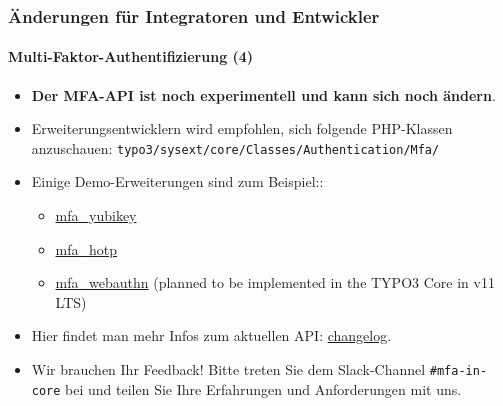 %

\begin{frame}[fragile]
	\frametitle{Änderungen für Integratoren und Entwickler}
	\framesubtitle{Multi-Faktor-Authentifizierung (4)}

	\begin{itemize}

		\item \textbf{Der MFA-API ist noch experimentell und kann sich noch ändern}.

		\item Erweiterungsentwicklern wird empfohlen, sich folgende PHP-Klassen anzuschauen:\newline
			\small\texttt{typo3/sysext/core/Classes/Authentication/Mfa/}\normalsize

		\item Einige Demo-Erweiterungen sind zum Beispiel::

			\begin{itemize}\small
				\item \href{https://github.com/derhansen/mfa_yubikey}{mfa\_yubikey}
				\item \href{https://github.com/o-ba/mfa_hotp}{mfa\_hotp}
				\item \href{https://github.com/bnf/mfa_webauthn}{mfa\_webauthn} (planned to be implemented in the TYPO3 Core in v11 LTS)
			\end{itemize}\normalsize

		\item Hier findet man mehr Infos zum aktuellen API:
			\href{https://docs.typo3.org/c/typo3/cms-core/master/en-us/Changelog/11.1/Feature-93526-MultiFactorAuthentication.html}{changelog}.

		\item Wir brauchen Ihr Feedback! Bitte treten Sie dem Slack-Channel \texttt{\#mfa-in-core} bei
			und teilen Sie Ihre Erfahrungen und Anforderungen mit uns.

	\end{itemize}

\end{frame}

